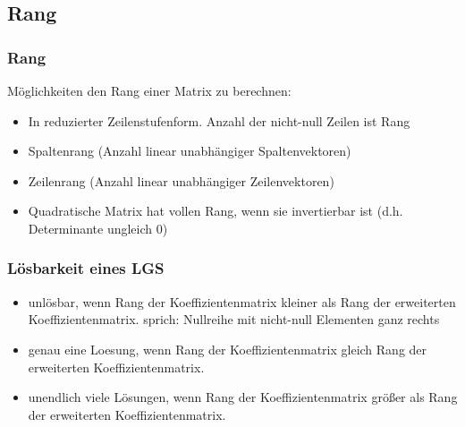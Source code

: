\subsection{Rang}
\begin{frame}
    \frametitle{Rang}
    Möglichkeiten den Rang einer Matrix zu berechnen:
    \begin{itemize}
        \item In reduzierter Zeilenstufenform.
        Anzahl der nicht-null Zeilen ist Rang
        \item Spaltenrang (Anzahl linear unabhängiger Spaltenvektoren)
        \item Zeilenrang (Anzahl linear unabhängiger Zeilenvektoren)
        \item Quadratische Matrix hat vollen Rang, wenn sie invertierbar ist (d.h. Determinante ungleich 0)
    \end{itemize}
\end{frame}

\begin{frame}
    \frametitle{Lösbarkeit eines LGS}
    \begin{itemize}
        \item unlösbar, wenn Rang der Koeffizientenmatrix kleiner als Rang der erweiterten Koeffizientenmatrix.
        sprich: Nullreihe mit nicht-null Elementen ganz rechts
        \item genau eine Loesung, wenn Rang der Koeffizientenmatrix gleich Rang der erweiterten Koeffizientenmatrix.
        \item unendlich viele Lösungen, wenn Rang der Koeffizientenmatrix größer als Rang der erweiterten Koeffizientenmatrix.
    \end{itemize}
\end{frame}